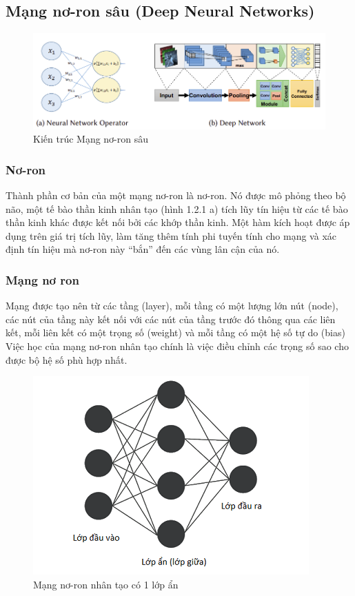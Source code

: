 \documentclass[11pt,a4paper]{article}
\numberwithin{equation}{subsection}
\numberwithin{figure}{subsection}
\numberwithin{table}{subsection}
\begin{document}
\subsection{Mạng nơ-ron sâu (Deep Neural Networks)}
\begin{figure}[!h]
\begin{center}
\includegraphics[scale=0.8]{DNN.PNG}
\end{center}
\caption{Kiến trúc Mạng nơ-ron sâu}
\end{figure}

\subsubsection{Nơ-ron}
Thành phần cơ bản của một mạng nơ-ron là nơ-ron. Nó được mô phỏng theo bộ não, một tế bào thần kinh nhân tạo (hình 1.2.1 a) tích lũy tín hiệu từ các tế bào thần kinh khác được kết nối bởi các khớp thần kinh. Một hàm kích hoạt được áp dụng trên giá trị tích lũy, làm tăng thêm tính phi tuyến tính cho mạng và xác định tín hiệu mà nơ-ron này “bắn” đến các vùng lân cận của nó.

\subsubsection{Mạng nơ ron}
Mạng được tạo nên từ các tầng (layer), mỗi tầng có một lượng lớn nút (node), các nút của tầng này kết nối với các nút của tầng trước đó thông qua các liên kết, mỗi liên kết có một trọng số (weight) và mỗi tầng có một hệ số tự do (bias)\\

Việc học của mạng nơ-ron nhân tạo chính là việc điều chỉnh các trọng số sao cho được bộ hệ số phù hợp nhất. 
\begin{figure}[!ht]
\begin{center}
\includegraphics[scale=0.9]{ANN.png}
\end{center}
\caption{Mạng nơ-ron nhân tạo có 1 lớp ẩn}
\end{figure}
\end{document}
